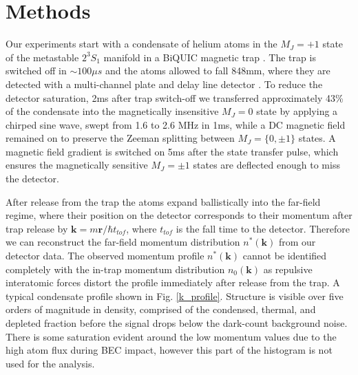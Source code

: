 \documentclass[%
	 aps,%
	 prl,%
	 a4paper,%
	 amsmath,amssymb,%
	 preprint,%
	 reprint,%
]{revtex4-1}
\begin{document}

\section{Methods}
Our experiments start with a condensate of helium atoms in the $M_J = +1$ state of the metastable $2^3 S_1$ manifold in a BiQUIC magnetic trap \cite{Dall2007}. The trap is switched off in $\sim 100\mu s$ and the atoms allowed to fall 848mm, where they are detected with a multi-channel plate and delay line detector \cite{Manning2010}.  To reduce the detector saturation, 2ms after trap switch-off we transferred approximately 43\% of the condensate into the magnetically insensitive $M_J=0$ state by applying a chirped sine wave, swept from 1.6 to 2.6 MHz in 1ms, while a DC magnetic field remained on to preserve the Zeeman splitting between $M_J = \{0,\pm 1\}$ states.  A magnetic field gradient is switched on 5ms after the state transfer pulse, which ensures the magnetically sensitive $M_J = \pm 1$ states are deflected enough to miss the detector. 

After release from the trap the atoms expand ballistically into the far-field regime, where their position on the detector corresponds to their momentum after trap release by $\textbf{k} = m\textbf{r}/\hbar t_{tof}$, where $t_{tof}$ is the fall time to the detector. Therefore we can reconstruct the far-field momentum distribution $n^*(\textbf{k})$ from our detector data. The observed momentum profile $n^*(\textbf{k})$ cannot be identified completely with the in-trap momentum distribution $n_0(\textbf{k})$ as repulsive interatomic forces distort the profile immediately after release from the trap. 
A typical condensate profile shown in Fig. \ref{k_profile}.  Structure is visible over five orders of magnitude in density, comprised of the condensed, thermal, and depleted fraction before the signal drops below the dark-count background noise. There is some saturation evident around the low momentum values due to the high atom flux during BEC impact, however this part of the histogram is not used for the analysis. 
\end{document}
